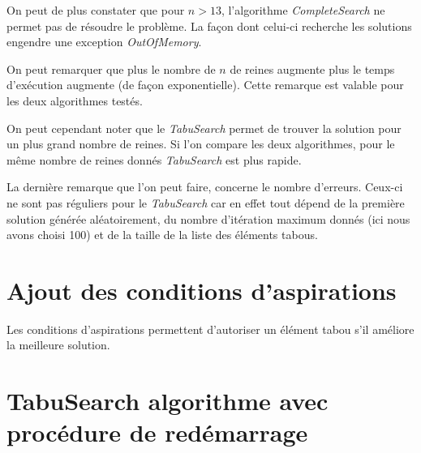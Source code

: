 \documentclass[a4paper,10pt]{article}
\begin{document}
On peut de plus constater que pour $n>13$, l'algorithme \emph{CompleteSearch} ne permet pas de résoudre le problème. La façon dont celui-ci recherche les solutions engendre une exception \emph{OutOfMemory}.

On peut remarquer que plus le nombre de $n$ de reines augmente plus le temps d'exécution augmente (de façon exponentielle). Cette remarque est valable pour les deux algorithmes testés.

On peut cependant noter que le \emph{TabuSearch} permet de trouver la solution pour un plus grand nombre de reines. Si l'on compare les deux algorithmes, pour le même nombre de reines donnés \emph{TabuSearch} est plus rapide.

La dernière remarque que l'on peut faire, concerne le nombre d'erreurs. Ceux-ci ne sont pas réguliers pour le \emph{TabuSearch} car en effet tout dépend de la première solution générée aléatoirement, du nombre d'itération maximum donnés (ici nous avons choisi 100) et de la taille de la liste des éléments tabous. 

\section{Ajout des conditions d'aspirations}
Les conditions d'aspirations permettent d'autoriser un élément tabou s'il améliore la meilleure solution.

\section{TabuSearch algorithme avec procédure de redémarrage}
\end{document}
